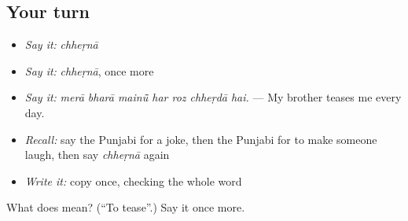 \subsection*{Your turn}
\begin{itemize}
\raggedright
  \item \emph{Say it:} \emph{chheṛnā}
  \item \emph{Say it:} \emph{chheṛnā}, once more
  \item \emph{Say it:} \emph{merā bharā mainū̃ har roz chheṛdā hai.} — My brother teases me every day.
  \item \emph{Recall:} say the Punjabi for a joke, then the Punjabi for to make someone laugh, then say \emph{chheṛnā} again
  \item \emph{Write it:} copy \textbf{} once, checking the whole word
\end{itemize}

\begin{tcolorbox}[breakable,colback=teal!4,colframe=teal!35!black,title={Before you move on}]
What does  mean? (\textquotedblleft{}To tease\textquotedblright{}.) Say it once more.
\end{tcolorbox}
